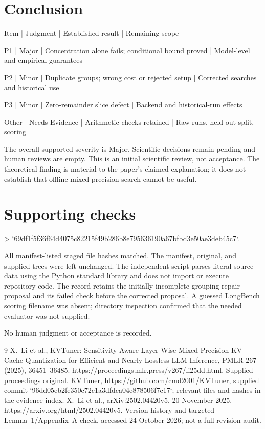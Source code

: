 \documentclass[10pt]{article}
\begin{document}
\section*{Conclusion}
Item | Judgment | Established result | Remaining scope\par
P1 | Major | Concentration alone fails; conditional bound proved | Model-level and empirical guarantees\par
P2 | Minor | Duplicate groups; wrong cost or rejected setup | Corrected searches and historical use\par
P3 | Minor | Zero-remainder slice defect | Backend and historical-run effects\par
Other | Needs Evidence | Arithmetic checks retained | Raw runs, held-out split, scoring\par
The overall supported severity is Major. Scientific decisions remain pending and human reviews are empty. This is an initial scientific review, not acceptance. The theoretical finding is material to the paper’s claimed explanation; it does not establish that offline mixed-precision search cannot be useful.\par
\section*{Supporting checks}
> `69df1f5f36f64d4075c82215f49b286b8e795636190a67bfbd3e50ae3deb45c7`.\par
All manifest-listed staged file hashes matched. The manifest, original, and supplied trees were left unchanged. The independent script parses literal source data using the Python standard library and does not import or execute repository code. The record retains the initially incomplete grouping-repair proposal and its failed check before the corrected proposal. A guessed LongBench scoring filename was absent; directory inspection confirmed that the needed evaluator was not supplied.\par
No human judgment or acceptance is recorded.\par
9 X. Li et al., KVTuner: Sensitivity-Aware Layer-Wise Mixed-Precision KV Cache Quantization for Efficient and Nearly Lossless LLM Inference, PMLR 267 (2025), 36451–36485. https://proceedings.mlr.press/v267/li25dd.html. Supplied proceedings original. KVTuner, https://github.com/cmd2001/KVTuner, supplied commit `96dd05eb2fe350c72c1a3dfdca04e878506f7c17`; relevant files and hashes in the evidence index. X. Li et al., arXiv:2502.04420v5, 20 November 2025. https://arxiv.org/html/2502.04420v5. Version history and targeted Lemma 1/Appendix A check, accessed 24 October 2026; not a full revision audit.\par
\end{document}
